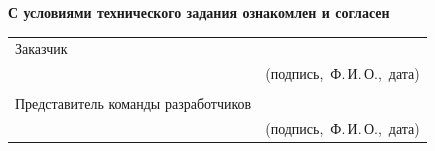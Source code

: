 \documentclass[12pt]{article}
\begin{document}
\begin{flushleft}
	\textbf{С условиями технического задания ознакомлен и согласен}\\[2em]
	\begin{tabular}{@{}p{9cm}p{6cm}@{}}
		Заказчик                            & \hrulefill                               \\[1em]
		                                    & \footnotesize(подпись,~Ф.\,И.\,О.,~дата) \\ \\[1.5em]
		Представитель команды разработчиков & \hrulefill                               \\[1em]
		                                    & \footnotesize(подпись,~Ф.\,И.\,О.,~дата) \\
	\end{tabular}
\end{flushleft}
\end{document}
